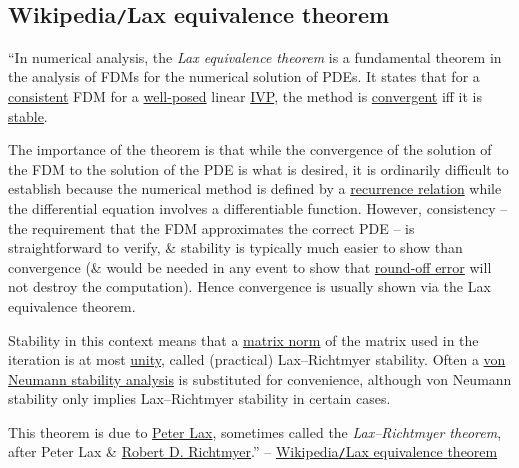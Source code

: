 \documentclass{article}
\begin{document}

\subsection{Wikipedia{\tt/}Lax equivalence theorem}
``In numerical analysis, the {\it Lax equivalence theorem} is a fundamental theorem in the analysis of FDMs for the numerical solution of PDEs. It states that for a \href{https://en.wikipedia.org/wiki/Numerical_methods_for_ordinary_differential_equations#Consistency_and_order}{consistent} FDM for a \href{https://en.wikipedia.org/wiki/Well-posed}{well-posed} linear \href{https://en.wikipedia.org/wiki/Initial_value_problem}{IVP}, the method is \href{https://en.wikipedia.org/wiki/Numerical_methods_for_ordinary_differential_equations#Convergence}{convergent} iff it is \href{https://en.wikipedia.org/wiki/Numerical_stability#Stability_in_numerical_differential_equations}{stable}.

The importance of the theorem is that while the convergence of the solution of the FDM to the solution of the PDE is what is desired, it is ordinarily difficult to establish because the numerical method is defined by a \href{https://en.wikipedia.org/wiki/Recurrence_relation}{recurrence relation} while the differential equation involves a differentiable function. However, consistency -- the requirement that the FDM approximates the correct PDE -- is straightforward to verify, \& stability is typically much easier to show than convergence (\& would be needed in any event to show that \href{https://en.wikipedia.org/wiki/Round-off_error}{round-off error} will not destroy the computation). Hence convergence is usually shown via the Lax equivalence theorem.

Stability in this context means that a \href{https://en.wikipedia.org/wiki/Matrix_norm}{matrix norm} of the matrix used in the iteration is at most \href{https://en.wikipedia.org/wiki/Unity_(mathematics)}{unity}, called (practical) Lax--Richtmyer stability. Often a \href{https://en.wikipedia.org/wiki/Von_Neumann_stability_analysis}{von Neumann stability analysis} is substituted for convenience, although von Neumann stability only implies Lax--Richtmyer stability in certain cases.

This theorem is due to \href{https://en.wikipedia.org/wiki/Peter_Lax}{\sc Peter Lax}, sometimes called the {\it Lax--Richtmyer theorem}, after {\sc Peter Lax} \& \href{https://en.wikipedia.org/wiki/Robert_D._Richtmyer}{\sc Robert D. Richtmyer}.'' -- \href{https://en.wikipedia.org/wiki/Lax_equivalence_theorem}{Wikipedia{\tt/}Lax equivalence theorem}
\end{document}

